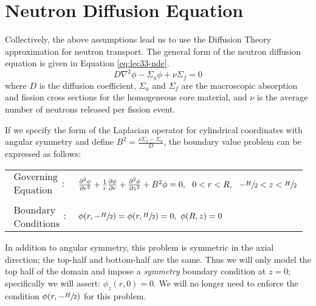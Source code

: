 \section{Neutron Diffusion Equation}

Collectively, the above assumptions lead us to use the Diffusion Theory approximation for neutron transport.  The general form of the neutron diffusion equation is given in Equation \ref{eq:lec33-nde}.
\begin{equation}
D\nabla^2\phi - \Sigma_a \phi + \nu \Sigma_f = 0
\label{eq:lec33-nde}
\end{equation}
where $D$ is the diffusion coefficient, $\Sigma_a$ and $\Sigma_f$ are the macroscopic absorption and fission cross sections for the homogeneous core material, and $\nu$ is the average number of neutrons released per fission event.

If we specify the form of the Laplacian operator for cylindrical coordinates with angular symmetry and define $B^2 = \frac{\nu \Sigma_f - \Sigma_a}{D}$, the boundary value problem can be expressed as follows:
\begin{table}[h]
\begin{tabular}{l l}
$\substack{\text{Governing} \\\text{Equation}}: $& $\frac{\partial^2 \phi}{\partial r^2} + \frac{1}{r}\frac{\partial \phi}{\partial r} + \frac{\partial^2 \phi}{\partial z^2} + B^2\phi= 0, \ \ 0<r<R, \ \ -\sfrac{H}{2}<z<\sfrac{H}{2} $\\
& \\
$\substack{\text{Boundary} \\ \text{Conditions}}: $ & $\phi(r,-\sfrac{H}{2}) = \phi(r,\sfrac{H}{2}) = 0, \  \phi(R,z) = 0$  \\ 
\end{tabular}
\end{table} 
In addition to angular symmetry, this problem is symmetric in the axial direction; the top-half and bottom-half are the same.  Thus we will only model the top half of the domain and impose a \emph{symmetry} boundary condition at $z=0$; specifically we will assert: $\phi_z(r,0) = 0$. We will no longer need to enforce the condition $\phi(r,-\sfrac{H}{2})$ for this problem.  


